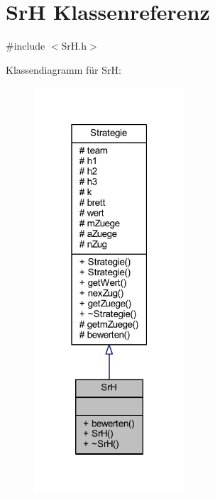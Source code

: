 \hypertarget{class_sr_h}{}\section{Sr\+H Klassenreferenz}
\label{class_sr_h}


{\ttfamily \#include $<$Sr\+H.\+h$>$}



Klassendiagramm für Sr\+H\+:\nopagebreak
\begin{figure}[H]
\begin{center}
\leavevmode
\includegraphics[width=159pt]{class_sr_h__inherit__graph}
\end{center}
\end{figure}


